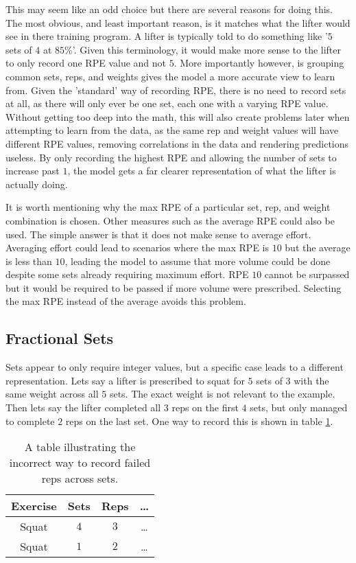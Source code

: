 This may seem like an odd choice but there are several reasons for doing this. The most obvious, and least important reason, is it matches what the lifter would see in there training program. A lifter is typically told to do something like '$5$ sets of $4$ at $85$\%'. Given this terminology, it would make more sense to the lifter to only record one RPE value and not $5$. More importantly however, is grouping common sets, reps, and weights gives the model a more accurate view to learn from. Given the 'standard' way of recording RPE, there is no need to record sets at all, as there will only ever be one set, each one with a varying RPE value. Without getting too deep into the math, this will also create problems later when attempting to learn from the data, as the same rep and weight values will have different RPE values, removing correlations in the data and rendering predictions useless. By only recording the highest RPE and allowing the number of sets to increase past $1$, the model gets a far clearer representation of what the lifter is actually doing.

It is worth mentioning why the max RPE of a particular set, rep, and weight combination is chosen. Other measures such as the average RPE could also be used. The simple answer is that it does not make sense to average effort. Averaging effort could lead to scenarios where the max RPE is $10$ but the average is less than $10$, leading the model to assume that more volume could be done despite some sets already requiring maximum effort. RPE $10$ cannot be surpassed but it would be required to be passed if more volume were prescribed. Selecting the max RPE instead of the average avoids this problem.

\subsection{Fractional Sets}
\label{sec:FractionalSets}

Sets appear to only require integer values, but a specific case leads to a different representation. Lets say a lifter is prescribed to squat for $5$ sets of $3$ with the same weight across all $5$ sets. The exact weight is not relevant to the example. Then lets say the lifter completed all $3$ reps on the first $4$ sets, but only managed to complete $2$ reps on the last set. One way to record this is shown in table \ref{tab:FailedSetExampleIncorrectData}.

\begin{table}[h]
    \centering
    \begin{tabular}{c|c|c|c}
        Exercise & Sets & Reps & \dots \\
        \hline
        Squat & $4$ & $3$ & \dots \\
        Squat & $1$ & $2$ & \dots \\ 
    \end{tabular}
    \caption{A table illustrating the incorrect way to record failed reps across sets.}
    \label{tab:FailedSetExampleIncorrectData}
\end{table}


